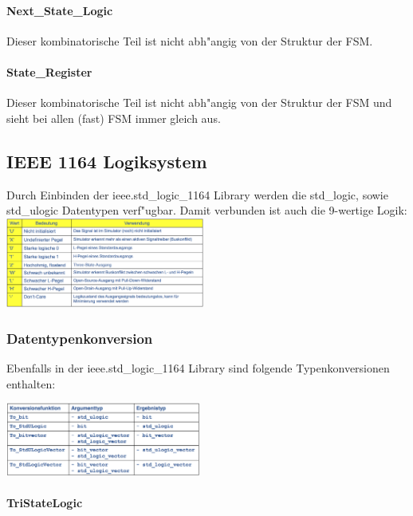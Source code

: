 			\begin{multicols}{2}
				\paragraph{Next\_State\_Logic} 
					Dieser kombinatorische Teil ist nicht abh"angig von der Struktur der 
					FSM.
					
				\columnbreak
				\paragraph{State\_Register}  
					Dieser kombinatorische Teil ist nicht abh"angig von der Struktur der 
					FSM und sieht bei allen (fast) FSM immer gleich aus.
					
			\end{multicols}
	
	\begin{multicols}{2}
		\subsection{IEEE 1164 Logiksystem}
			Durch Einbinden der ieee.std\_logic\_1164 Library werden die std\_logic, sowie 
			std\_ulogic Datentypen verf"ugbar. Damit verbunden ist auch die 9-wertige Logik:
				\includegraphics[width=0.49\textwidth]{pics/ieee1164logicsystem}
		\subsubsection{Datentypenkonversion}
			Ebenfalls in der ieee.std\_logic\_1164 Library sind folgende Typenkonversionen 
			enthalten:
			\begin{center}
				\includegraphics[width=0.48\textwidth]{pics/typeconversion}
			\end{center}
			\paragraph{TriStateLogic}
			
	\end{multicols}
	\pagebreak
